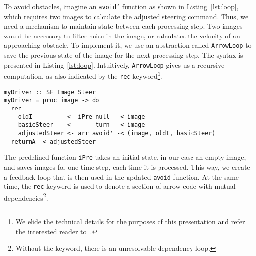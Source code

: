 To avoid obstacles, imagine an \texttt{avoid'} function as shown in Listing~\ref{lst:loop}, which requires two images to calculate the adjusted steering command. 
Thus, we need a mechanism to maintain state between each processing step.
Two images would be necessary to filter noise in the image, or calculates the velocity of an approaching obstacle.
To implement it, we use an abstraction called \texttt{ArrowLoop} to  save the previous state of the image for the next processing step.
The syntax is presented in Listing~\ref{lst:loop}.
Intuitively, \texttt{ArrowLoop} gives us a recursive computation, as also indicated by the \texttt{rec} keyword\footnote{We elide the technical details for the purposes of this presentation and refer the interested reader to~\cite{paterson2001icfp}.}.


\begin{lstlisting}[float,caption=Using ArrowLoop to send feedback,label=lst:loop]
myDriver :: SF Image Steer
myDriver = proc image -> do
  rec
    oldI          <- iPre null  -< image
    basicSteer    <-      turn  -< image
    adjustedSteer <- arr avoid' -< (image, oldI, basicSteer)
  returnA -< adjustedSteer
\end{lstlisting}

The predefined function \texttt{iPre} takes an initial state, in our case an empty image, and saves images for one time step, each time it is processed.
This way, we create a feedback loop that is then used in the updated \texttt{avoid} function.
At the same time, the \texttt{rec} keyword is used to denote a section of arrow code with  mutual dependencies\footnote{Without the keyword, there is an unresolvable dependency loop.}.



 
